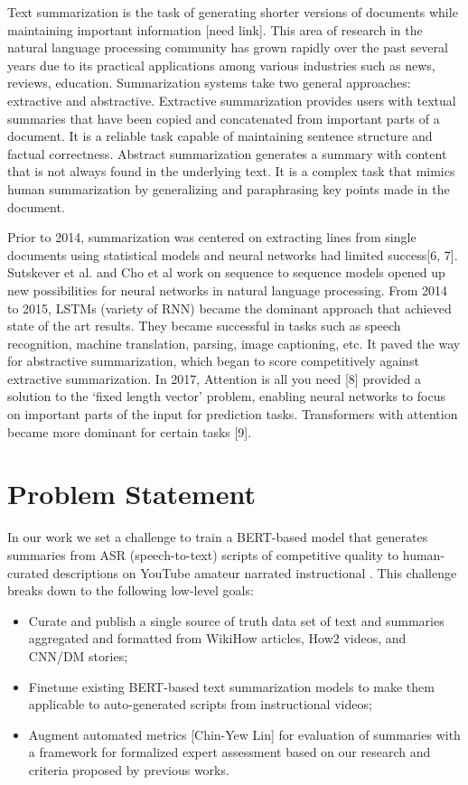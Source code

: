 \documentclass{article}
\begin{document}
Text summarization is the task of generating shorter versions of documents while maintaining important information [need link]. This area of research in the natural language processing community has grown rapidly over the past several years due to its practical applications among various industries such as news, reviews, education. Summarization systems take two general approaches: extractive and abstractive. Extractive summarization provides users with textual summaries that have been copied and concatenated from important parts of a document. It is a reliable task capable of maintaining sentence structure and factual correctness. Abstract summarization generates a summary with content that is not always found in the underlying text. It is a complex task that mimics human summarization by generalizing and paraphrasing key points made in the document. 

Prior to 2014, summarization was centered on extracting lines from single documents using statistical models and neural networks had limited success[6, 7]. Sutskever et al. and Cho et al work on sequence to sequence models opened up new possibilities for neural networks in natural language processing. From 2014 to 2015, LSTMs (variety of RNN) became the dominant approach that achieved state of the art results. They became successful in tasks such as speech recognition, machine translation, parsing, image captioning, etc. It paved the way for abstractive summarization, which began to score competitively against extractive summarization. In 2017, Attention is all you need [8] provided a solution to the ‘fixed length vector’ problem, enabling neural networks to focus on important parts of the input for prediction tasks. Transformers with attention became more dominant for certain tasks [9].

\section{Problem Statement}

In our work we set a challenge to train a BERT-based model  that generates summaries from ASR (speech-to-text) scripts of competitive quality to human-curated descriptions on YouTube amateur narrated instructional . This challenge breaks down to the following low-level goals:
\begin{itemize}

\item Curate and publish a single source of truth data set of text and summaries aggregated and formatted from WikiHow articles, How2 videos, and CNN/DM stories;
\item Finetune existing BERT-based text summarization models to make them applicable to auto-generated scripts from instructional videos; 
\item Augment automated  metrics [Chin-Yew Lin] for evaluation of summaries with a framework for formalized expert assessment based on our research and criteria proposed by previous works.
\end{itemize}
\end{document}

